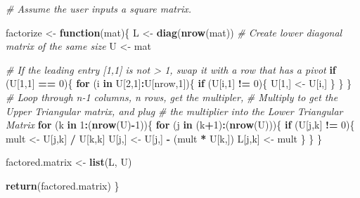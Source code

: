 \documentclass[]{article}
\newenvironment{Shaded}{\begin{snugshade}}{\end{snugshade}}
\newcommand{\KeywordTok}[1]{\textcolor[rgb]{0.13,0.29,0.53}{\textbf{#1}}}
\newcommand{\DecValTok}[1]{\textcolor[rgb]{0.00,0.00,0.81}{#1}}
\newcommand{\StringTok}[1]{\textcolor[rgb]{0.31,0.60,0.02}{#1}}
\newcommand{\CommentTok}[1]{\textcolor[rgb]{0.56,0.35,0.01}{\textit{#1}}}
\newcommand{\ControlFlowTok}[1]{\textcolor[rgb]{0.13,0.29,0.53}{\textbf{#1}}}
\newcommand{\OperatorTok}[1]{\textcolor[rgb]{0.81,0.36,0.00}{\textbf{#1}}}
\newcommand{\NormalTok}[1]{#1}
\begin{document}
\begin{Shaded}
\begin{Highlighting}[]
\CommentTok{# Assume the user inputs a square matrix.}
  
\NormalTok{factorize <-}\StringTok{ }\ControlFlowTok{function}\NormalTok{(mat)\{}
\NormalTok{  L <-}\StringTok{ }\KeywordTok{diag}\NormalTok{(}\KeywordTok{nrow}\NormalTok{(mat))    }\CommentTok{# Create lower diagonal matrix of the same size}
\NormalTok{  U <-}\StringTok{ }\NormalTok{mat}

  \CommentTok{# If the leading entry [1,1] is not > 1, swap it with a row that has a pivot}
  \ControlFlowTok{if}\NormalTok{ (U[}\DecValTok{1}\NormalTok{,}\DecValTok{1}\NormalTok{] }\OperatorTok{==}\StringTok{ }\DecValTok{0}\NormalTok{)\{}
    \ControlFlowTok{for}\NormalTok{ (i }\ControlFlowTok{in}\NormalTok{ U[}\DecValTok{2}\NormalTok{,}\DecValTok{1}\NormalTok{]}\OperatorTok{:}\NormalTok{U[nrow,}\DecValTok{1}\NormalTok{])\{}
      \ControlFlowTok{if}\NormalTok{ (U[i,}\DecValTok{1}\NormalTok{] }\OperatorTok{!=}\StringTok{ }\DecValTok{0}\NormalTok{)\{}
\NormalTok{        U[}\DecValTok{1}\NormalTok{,] <-}\StringTok{ }\NormalTok{U[i,]}
\NormalTok{      \}}
\NormalTok{    \}}
\NormalTok{  \}}
  \CommentTok{# Loop through n-1 columns, n rows, get the multipler,}
  \CommentTok{# Multiply to get the Upper Triangular matrix, and plug}
  \CommentTok{# the multiplier into the Lower Triangular Matrix}
  \ControlFlowTok{for}\NormalTok{ (k }\ControlFlowTok{in} \DecValTok{1}\OperatorTok{:}\NormalTok{(}\KeywordTok{nrow}\NormalTok{(U)}\OperatorTok{-}\DecValTok{1}\NormalTok{))\{}
    \ControlFlowTok{for}\NormalTok{ (j }\ControlFlowTok{in}\NormalTok{ (k}\OperatorTok{+}\DecValTok{1}\NormalTok{)}\OperatorTok{:}\NormalTok{(}\KeywordTok{nrow}\NormalTok{(U)))\{}
      \ControlFlowTok{if}\NormalTok{ (U[j,k] }\OperatorTok{!=}\StringTok{ }\DecValTok{0}\NormalTok{)\{}
\NormalTok{        mult <-}\StringTok{ }\NormalTok{U[j,k] }\OperatorTok{/}\StringTok{ }\NormalTok{U[k,k]}
\NormalTok{        U[j,] <-}\StringTok{ }\NormalTok{U[j,] }\OperatorTok{-}\StringTok{ }\NormalTok{(mult }\OperatorTok{*}\StringTok{ }\NormalTok{U[k,])}
\NormalTok{        L[j,k] <-}\StringTok{ }\NormalTok{mult}
\NormalTok{      \}}
\NormalTok{    \}}
\NormalTok{  \}}
  
\NormalTok{  factored.matrix <-}\StringTok{ }\KeywordTok{list}\NormalTok{(L, U)}
  
  \KeywordTok{return}\NormalTok{(factored.matrix)}
\NormalTok{\}}
\end{Highlighting}
\end{Shaded}
\end{document}
